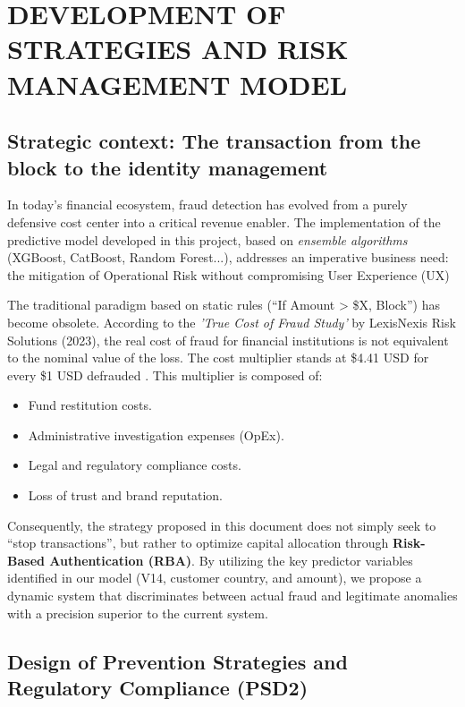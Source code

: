 \documentclass[12pt,a4paper]{report}
\begin{document}
\chapter{DEVELOPMENT OF STRATEGIES AND RISK MANAGEMENT MODEL}

\section{Strategic context: The transaction from the block to the identity management}

In today's financial ecosystem, fraud detection has evolved from a purely defensive cost center into a critical revenue enabler. The implementation of the predictive model developed in this project, based on \textit{ensemble algorithms} (XGBoost, CatBoost, Random Forest...), addresses an imperative business need: the mitigation of Operational Risk without compromising User Experience (UX)

The traditional paradigm based on static rules (\textquotedblleft If Amount > \$X, Block\textquotedblright) has become obsolete. According to the \textit{'True Cost of Fraud Study'} by LexisNexis Risk Solutions (2023), the real cost of fraud for financial institutions is not equivalent to the nominal value of the loss. The cost multiplier stands at \$4.41 USD for every \$1 USD defrauded \cite{lexisnexis2023a}. This multiplier is composed of:



\begin{itemize}
    \item Fund restitution costs.
    \item Administrative investigation expenses (OpEx).
    \item Legal and regulatory compliance costs.
    \item Loss of trust and brand reputation.
\end{itemize}


Consequently, the strategy proposed in this document does not simply seek to \textquotedblleft stop transactions\textquotedblright, but rather to optimize capital allocation through \textbf{Risk-Based Authentication (RBA)}. By utilizing the key predictor variables identified in our model (V14, customer country, and amount), we propose a dynamic system that discriminates between actual fraud and legitimate anomalies with a precision superior to the current system.


\section{Design of Prevention Strategies and Regulatory Compliance (PSD2)}
\end{document}
